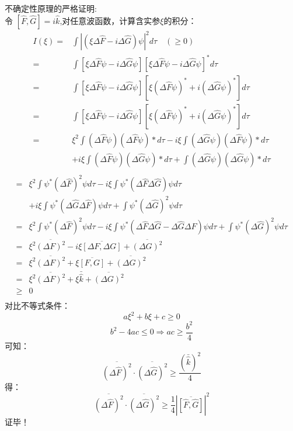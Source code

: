 \begin{frame} [allowframebreaks=]
    \frametitle{}
    \alert{不确定性原理的严格证明:} \\
    令 $[\hat{F}, \hat{G}]= i\hat{k}$,对任意波函数，计算含实参$\xi$的积分：
    $$
    \begin{aligned}
    I(\xi)= &\int|(\xi\Delta \hat{F}-i \Delta \hat{G}) \psi|^{2} d \tau \quad (\geq 0) \\
    =&\int[\xi \Delta \hat{F} \psi-i \Delta \hat{G} \psi][\xi \Delta \hat{F} \psi-i \Delta \hat{G} \psi]^{*} d \tau \\
    =&\int[\xi \Delta \hat{F} \psi-i \Delta \hat{G} \psi] [\xi(\Delta \hat{F} \psi)^{*}+i(\Delta \hat{G} \psi)^{*}] d \tau \\
    =&\int[\xi \Delta \hat{F} \psi-i \Delta \hat{G} \psi]\left[\xi(\Delta \hat{F} \psi)^{*}+i(\Delta \hat{G} \psi)^{*}\right] d \tau \\
    =& \xi^{2} \int(\Delta \hat{F} \psi)(\Delta \hat{F} \psi) * d \tau-i \xi \int(\Delta \hat{G} \psi)(\Delta \hat{F} \psi) * d \tau \\
        &+i \xi \int(\Delta \hat{F} \psi)(\Delta \hat{G} \psi) * d \tau+\int(\Delta \hat{G} \psi)(\Delta \hat{G} \psi) * d \tau \\
    \end{aligned}
    $$
    $$
    \begin{aligned}
    =& \xi^{2} \int \psi^{*}(\Delta \hat{F})^{2} \psi d \tau-i \xi \int \psi^{*}(\Delta \hat{F} \Delta \hat{G}) \psi d \tau \\
    &+i \xi \int \psi^{*}(\Delta \hat{G} \Delta \hat{F}) \psi d \tau+\int \psi^{*}(\Delta \hat{G})^{2} \psi d \tau \\
    =& \xi^{2} \int \psi^{*}(\Delta \hat{F})^{2} \psi d \tau-i \xi \int \psi^{*}(\Delta \hat{F} \Delta \hat{G}-\Delta \hat{G} \Delta \hat{F}) \psi d \tau+\int \psi^{*}(\Delta \hat{G})^{2} \psi d \tau \\
    =& \xi^{2} \overline{(\Delta F)^{2}}-i \xi \overline{[\Delta F, \Delta G]}+\overline{(\Delta G)^{2}}\\
    =&\xi^{2} \overline{(\Delta F)^{2}}+\xi \overline{[F, G]}+\overline{(\Delta G)^{2}} \\
    =&\xi^{2} \overline{(\Delta F)^{2}}+\xi \bar{\hat{k}}+\overline{(\Delta G)^{2}} \\
    \geq & 0\\
    \end{aligned}
    $$
    对比不等式条件：
    $$
    a \xi^{2}+b \xi+c \geq 0
    $$
    $$
    b^{2}-4 a c \leq 0 \Rightarrow a c \geq \frac{b^{2}}{4}
    $$
    可知： 
    $$
    \overline{(\Delta \hat{F})^{2}} \cdot \overline{(\Delta \hat{G})^{2}} \geq \frac{(\bar{\hat{k}})^{2}}{4}
    $$
    得： 
    $$
    \overline{(\Delta \hat{F})^{2}} \cdot \overline{(\Delta \hat{G})^{2}} \geq \frac{1}{4}|\overline{[\hat{F}, \hat{G}]}|^{2}
    $$
    证毕！
\end{frame} 


